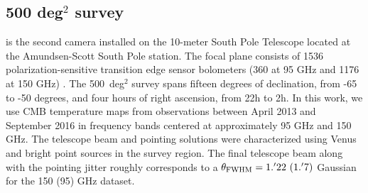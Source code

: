 \subsection{\sptpol{} {\rm 500} deg$^{2}$ survey}\label{sec_sptpol}
\sptpol{} is the second camera installed on the \mbox{10-meter} South Pole Telescope \citep[SPT,][]{padin08, carlstrom11} located at the Amundsen-Scott South Pole station.
The \sptpol{} focal plane consists of 1536 polarization-sensitive transition edge sensor bolometers (360 at 95 GHz and 1176 at 150 GHz) \citep{austermann12}.
The \sptpol{} 500~deg$^{2}$ survey spans fifteen degrees of declination, from -65 to -50 degrees, and four hours of right ascension, from 22h to 2h. 
In this work, we use CMB temperature maps from observations between April 2013 and September 2016 in frequency bands centered at approximately 95 GHz and 150 GHz. 
The telescope beam and pointing solutions were characterized using Venus and bright point sources in the \sptpol{} survey region. 
The final telescope beam along with the pointing jitter roughly corresponds to a $\theta_{\rm FWHM} = 1.^{\prime}22\ (1.^{\prime}7)$ Gaussian for the 150 (95) GHz dataset.

